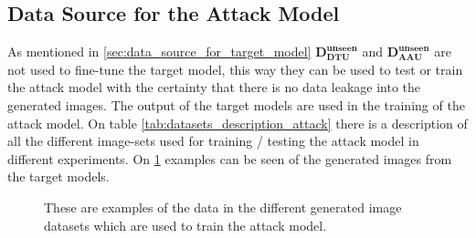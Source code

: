 \subsection{Data Source for the Attack Model} \label{sec:data_source_for_attack_model}
As mentioned in \cref{sec:data_source_for_target_model} $\mathbf{D_{DTU}^{unseen}}$ and $\mathbf{D_{AAU}^{unseen}}$ are not used to fine-tune the target model, this way they can be used to test or train the attack model with the certainty that there is no data leakage into the generated images. The output of the target models are used in the training of the attack model. On table \cref{tab:datasets_description_attack} there is a description of all the different image-sets used for training / testing the attack model in different experiments. On \cref{fig:attack_model_image_example} examples can be seen of the generated images from the target models.




\begin{figure}[h!t]
\centering
{}%
\hfill
{}
\hfill
{}
\hfill
{}
\hfill
{}
\hfill
{}
\caption{These are examples of the data in the different generated image datasets which are used to train the attack model.}
\label{fig:attack_model_image_example}
\end{figure}

